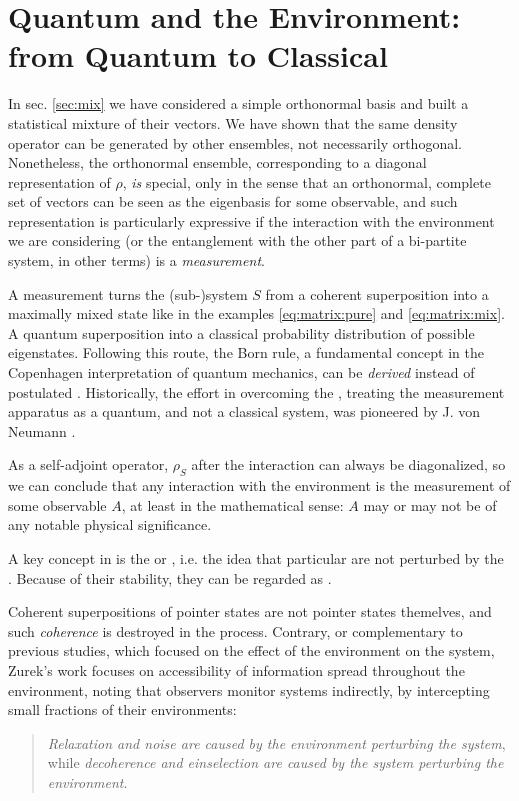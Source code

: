 \section{Quantum and the Environment: from Quantum to Classical}
\label{sec:q2c}

In sec. \ref{sec:mix} we have considered a simple orthonormal basis
and built a statistical mixture of their vectors. We have shown
that the same density operator can be generated by other ensembles,
not necessarily orthogonal. Nonetheless, the orthonormal ensemble,
corresponding to a diagonal representation of $\rho$, \emph{is}
special, only in the sense that an orthonormal, complete set of
vectors can be seen as the eigenbasis for some observable,
and such representation is particularly expressive if the
interaction with the environment we are considering
(or the entanglement with the other part of a bi-partite system, in other terms)
is a \emph{measurement}.

A measurement turns
the (sub-)system $S$ from a coherent superposition into a
maximally mixed state like in the examples
\eqref{eq:matrix:pure} and \eqref{eq:matrix:mix}.
A quantum superposition into a classical probability
distribution of possible eigenstates.
Following this route, the Born rule, a fundamental concept in the
Copenhagen interpretation of quantum mechanics, can be
\emph{derived} instead of postulated
\parencite{Zurek_Einselect}.
Historically,
the effort in overcoming the ,
treating the measurement apparatus as a quantum,
and not a classical system,
was pioneered by J. von Neumann \parencite{VonNeumann}.

As a self-adjoint operator, $\rho_S$ after the interaction
can always be diagonalized, so we can conclude that any
interaction with the environment is the measurement of some
observable $A$, at least in the mathematical sense: $A$ may or
may not be of any notable physical significance.

A key concept in \cite{Zurek_Einselect} is the
 or ,
i.e. the idea that particular  are not
perturbed by the .
Because of their stability, they can be regarded as
.

Coherent superpositions of pointer states are not pointer states
themelves, and such \emph{coherence} is destroyed in the process. 
Contrary,
or complementary to previous studies, which focused on the effect of
the environment on the system, Zurek's work
\parencite{Zurek_Einselect}
focuses on
accessibility of information spread throughout the environment,
noting that observers monitor systems indirectly, by intercepting
small fractions of their environments:
\begin{quote}
\emph{Relaxation and noise are caused by the environment perturbing
the system}, while \emph{decoherence and einselection
are caused by the system perturbing the environment}.
\end{quote}

